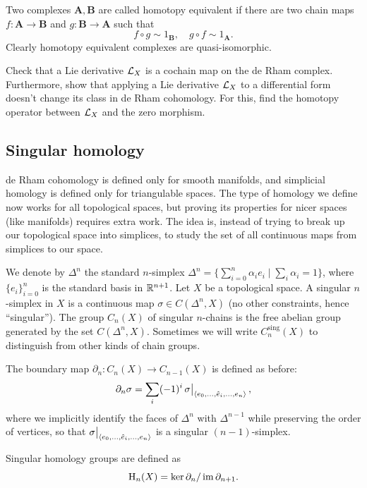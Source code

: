 \begin{defn}
    Two complexes $\bm{A},\bm{B}$ are called homotopy equivalent if there are two chain maps $f:\bm{A}\to \bm{B}$ and $g:\bm{B}\to\bm{A}$ such that
    \[f\circ g\sim 1_{\bm{B}},\quad g\circ f\sim 1_{\bm{A}}.\]
    Clearly homotopy equivalent complexes are quasi-isomorphic.
\end{defn}


\begin{xca}\label{Lie derivative homotopy operator}
    Check that a Lie derivative $\mathcal{L}_X$ is a cochain map on the de Rham complex. Furthermore, show that applying a Lie derivative $\mathcal{L}_X$ to a differential form doesn't change its class in de Rham cohomology. For this, find the homotopy operator between $\mathcal{L}_X$ and the zero morphism.
\end{xca}







\subsection{Singular homology}

de Rham cohomology is defined only for smooth manifolds, and simplicial homology is defined only for triangulable spaces. The type of homology we define now works for all topological spaces, but proving its properties for nicer spaces (like manifolds) requires extra work. The idea is, instead of trying to break up our topological space into simplices, to study the set of all continuous maps from simplices to our space.

\begin{defn}
    We denote by $\Delta^n$ the standard $n$-simplex $\Delta^n=\{\sum_{i=0}^{n} \alpha_i e_i\mid \sum_i\alpha_i=1\}$, where $\{e_i\}_{i=0}^{n}$ is the standard basis in $\mathbb{R}^{n+1}$. Let $X$ be a topological space. A singular $n$-simplex in $X$ is a continuous map $\sigma\in C(\Delta^n, X)$ (no other constraints, hence ``singular''). The group $C_n(X)$ of singular $n$-chains is the free abelian group generated by the set $C(\Delta^n,X)$. Sometimes we will write $C^{\text{sing}}_n(X)$ to distinguish from other kinds of chain groups.
\end{defn}
\begin{defn}
    The boundary map $\partial_n:C_n(X)\to C_{n-1}(X)$ is defined as before:
    \[\partial_n\sigma=\sum_i (-1)^i\restr{\sigma}{\langle e_0,\ldots,\wh{e}_i,\ldots,e_n\rangle},\]
    where we implicitly identify the faces of $\Delta^n$ with $\Delta^{n-1}$ while preserving the order of vertices, so that $\restr{\sigma}{\langle e_0,\ldots,\wh{e}_i,\ldots,e_n\rangle}$ is a singular $(n-1)$-simplex.
    
    Singular homology groups are defined as
    \[\mathrm{H}_n(X)=\ker\partial_n/\operatorname{im}\partial_{n+1}.\]
\end{defn}


